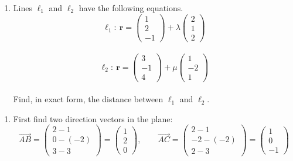 \documentclass[leqno]{article}
\begin{document}
\begin{enumerate}[
  label=\textbf{\arabic*.},
  leftmargin=*,
  topsep=0pt,
  partopsep=0pt,
  parsep=0pt
]
\begin{enumerate}[label=\textbf{(\alph*)}]
  The point $D$ has coordinates $(4,1,0)$. Find the shortest distance between $D$ and $\Pi$.  \\
  \item Lines $\ell_1$ and $\ell_2$ have the following equations. \\
  \[
  \ell_1:\ \mathbf{r}=\begin{pmatrix}1\\2\\-1\end{pmatrix}+\lambda\begin{pmatrix}2\\1\\2\end{pmatrix}
  \] \\
  \[
  \ell_2:\ \mathbf{r}=\begin{pmatrix}3\\-1\\4\end{pmatrix}+\mu\begin{pmatrix}1\\-2\\1\end{pmatrix}
  \] \\
  Find, in exact form, the distance between $\ell_1$ and $\ell_2$.  \\
\end{enumerate}

\vspace*{10pt}

\begin{djsSolution}
\begin{enumerate}[label=\textbf{(\alph*)}]
  \item First find two direction vectors in the plane:
\[
\overrightarrow{AB}=\begin{pmatrix}2-1\\0-(-2)\\3-3\end{pmatrix}
=\begin{pmatrix}1\\2\\0\end{pmatrix},
\qquad
\overrightarrow{AC}=\begin{pmatrix}2-1\\-2-(-2)\\2-3\end{pmatrix}
=\begin{pmatrix}1\\0\\-1\end{pmatrix}
\]


\end{enumerate}
\end{djsSolution}
\end{enumerate}
\end{document}
